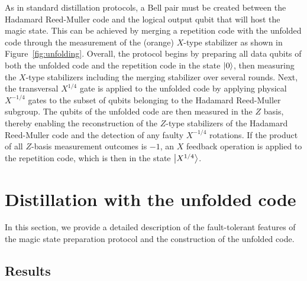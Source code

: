 \documentclass[%
 reprint,
superscriptaddress,
 amsmath,amssymb,
 aps,
]{revtex4-2}
\begin{document}
As in standard distillation protocols, a Bell pair must be created between the Hadamard Reed-Muller code and the logical output qubit that will host the magic state. This can be achieved by merging a repetition code with the unfolded code through the measurement of the (orange) $X$-type stabilizer as shown in Figure~\ref{fig:unfolding}. Overall, the protocol begins by preparing all data qubits of both the unfolded code and the repetition code in the state $\ket{0}$, then measuring the $X$-type stabilizers including the merging stabilizer over several rounds. Next, the transversal $X^{1/4}$ gate is applied to the unfolded code by applying physical $X^{-1/4}$ gates to the subset of qubits belonging to the Hadamard Reed-Muller subgroup. The qubits of the unfolded code are then measured in the $Z$ basis, thereby enabling the reconstruction of the $Z$-type stabilizers of the Hadamard Reed-Muller code and the detection of any faulty $X^{-1/4}$ rotations. If the product of all $Z$-basis measurement outcomes is $-1$, an $X$ feedback operation is applied to the repetition code, which is then in the state $\ket{X^{1/4}}$.

\section{Distillation with the unfolded code}
\label{sec:repetition code}

In this section, we provide a detailed description of the fault-tolerant features of the magic state preparation protocol and the construction of the unfolded code.

\subsection{Results}
\end{document}
